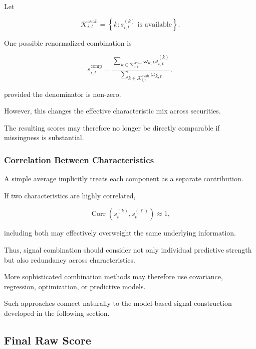 \documentclass[11pt,a4paper]{article}
\begin{document}
Let

\begin{equation}
\mathcal{K}_{i,t}^{\mathrm{avail}}
=
\left\{
k:
s_{i,t}^{(k)}
\text{ is available}
\right\}.
\end{equation}

One possible renormalized combination is

\begin{equation}
\boxed{
s_{i,t}^{\mathrm{comp}}
=
\frac{
\sum_{k\in\mathcal{K}_{i,t}^{\mathrm{avail}}}
\omega_{k,t}s_{i,t}^{(k)}
}{
\sum_{k\in\mathcal{K}_{i,t}^{\mathrm{avail}}}
\omega_{k,t}
},
}
\end{equation}

provided the denominator is non-zero.

However, this changes the effective characteristic mix across securities.

The resulting scores may therefore no longer be directly comparable if
missingness is substantial.


\subsubsection{Correlation Between Characteristics}

A simple average implicitly treats each component as a separate contribution.

If two characteristics are highly correlated,

\begin{equation}
\operatorname{Corr}
\left(
s_t^{(k)},
s_t^{(\ell)}
\right)
\approx1,
\end{equation}

including both may effectively overweight the same underlying information.

Thus, signal combination should consider not only individual predictive
strength but also redundancy across characteristics.

More sophisticated combination methods may therefore use covariance,
regression, optimization, or predictive models.

Such approaches connect naturally to the model-based signal construction
developed in the following section.


\subsection{Final Raw Score}
\label{subsec:final_raw_score}
\end{document}
